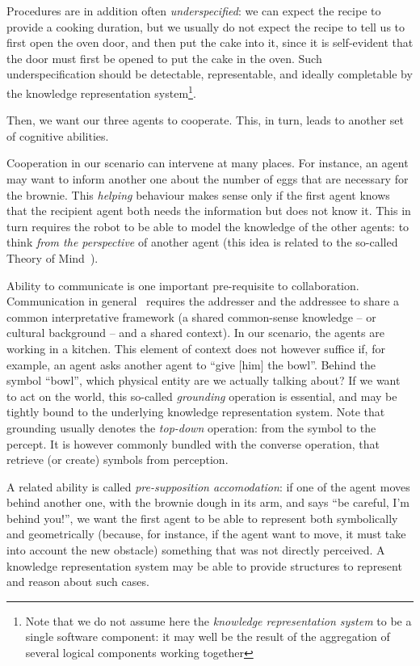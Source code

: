 \documentclass[a4paper, twocolumn]{article}
\begin{document}
Procedures are in addition often \emph{underspecified}: we can expect the recipe
to provide a cooking duration, but we usually do not expect the recipe to tell
us to first open the oven door, and then put the cake into it, since it is
self-evident that the door must first be opened to put the cake in the oven.
Such underspecification should be detectable, representable, and ideally
completable by the knowledge representation system\footnote{Note that we do not
assume here the {\it knowledge representation system} to be a single software
component: it may well be the result of the aggregation of several logical
components working together}.

Then, we want our three agents to cooperate. This, in turn, leads to another
set of cognitive abilities.

Cooperation in our scenario can intervene at many places. For instance, an
agent may want to inform another one about the number of eggs that are
necessary for the brownie. This \emph{helping} behaviour makes sense only if
the first agent knows that the recipient agent both needs the information but
does not know it. This in turn requires the robot to be able to model the
knowledge of the other agents: to think \emph{from the perspective} of another
agent (this idea is related to the so-called Theory of Mind~\cite{Leslie2000}).

Ability to communicate is one important pre-requisite to collaboration.
Communication in general~\cite{Jakobson1960} requires the addresser and the
addressee to share a common interpretative framework (a shared common-sense
knowledge -- or cultural background -- and a shared context). In our scenario,
the agents are working in a kitchen. This element of context does not however
suffice if, for example, an agent asks another agent to ``give {[him]} the
bowl''. Behind the symbol ``bowl'', which physical entity are we actually
talking about? If we want to act on the world, this so-called \emph{grounding}
operation is essential, and may be tightly bound to the underlying knowledge
representation system. Note that grounding usually denotes the {\it top-down}
operation: from the symbol to the percept. It is however commonly bundled with
the converse operation, that retrieve (or create) symbols from perception.

A related ability is called \emph{pre-supposition accomodation}: if one of the
agent moves behind another one, with the brownie dough in its arm, and says
``be careful, I'm behind you!'', we want the first agent to be able to
represent both symbolically and geometrically (because, for instance, if the
agent want to move, it must take into account the new obstacle) something that
was not directly perceived. A knowledge representation system may be able to
provide structures to represent and reason about such cases.
\end{document}
